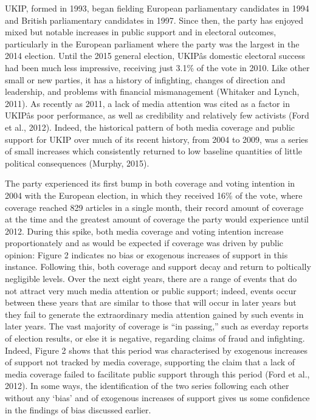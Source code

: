 \documentclass[12pt,article]{article}
\begin{document}
UKIP, formed in 1993, began fielding European parliamentary candidates
in 1994 and British parliamentary candidates in 1997. Since then, the
party has enjoyed mixed but notable increases in public support and in
electoral outcomes, particularly in the European parliament where the
party was the largest in the 2014 election. Until the 2015 general
election, UKIPâs domestic electoral success had been much less
impressive, receiving just 3.1\% of the vote in 2010. Like other small
or new parties, it has a history of infighting, changes of direction and
leadership, and problems with financial mismanagement (Whitaker and
Lynch, 2011). As recently as 2011, a lack of media attention was cited
as a factor in UKIPâs poor performance, as well as credibility and
relatively few activists (Ford et al., 2012). Indeed, the historical
pattern of both media coverage and public support for UKIP over much of
its recent history, from 2004 to 2009, was a series of small increases
which consistently returned to low baseline quantities of little
political consequences (Murphy, 2015).

The party experienced its first bump in both coverage and voting
intention in 2004 with the European election, in which they received
16\% of the vote, where coverage reached 829 articles in a single month,
their record amount of coverage at the time and the greatest amount of
coverage the party would experience until 2012. During this spike, both
media coverage and voting intention increase proportionately and as
would be expected if coverage was driven by public opinion: Figure 2
indicates no bias or exogenous increases of support in this instance.
Following this, both coverage and support decay and return to poltically
negligible levels. Over the next eight years, there are a range of
events that do not attract very much media attention or public support;
indeed, events occur between these years that are similar to those that
will occur in later years but they fail to generate the extraordinary
media attention gained by such events in later years. The vast majority
of coverage is ``in passing,'' such as everday reports of election
results, or else it is negative, regarding claims of fraud and
infighting. Indeed, Figure 2 shows that this period was characterised by
exogenous increases of support not tracked by media coverage, supporting
the claim that a lack of media coverage failed to facilitate public
support through this period (Ford et al., 2012). In some ways, the
identification of the two series following each other without any `bias'
and of exogenous increases of support gives us some confidence in the
findings of bias discussed earlier.
\end{document}
